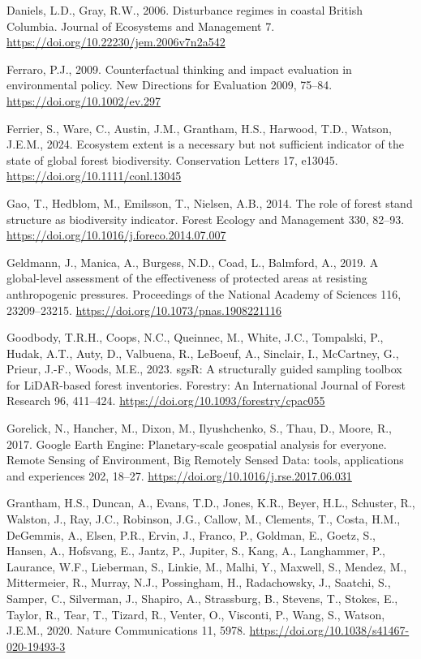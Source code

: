 \documentclass[
]{agujournal2019}
\newlength{\cslhangindent}
\newenvironment{CSLReferences}[2] %
 {\begin{list}{}{%
  \setlength{\itemindent}{0pt}
  \setlength{\leftmargin}{0pt}
  \setlength{\parsep}{0pt}
  \ifodd #1
   \setlength{\leftmargin}{\cslhangindent}
   \setlength{\itemindent}{-1\cslhangindent}
  \fi
  \setlength{\itemsep}{#2\baselineskip}}}
 {\end{list}}
\begin{document}
\begin{CSLReferences}{1}{0}
Daniels, L.D., Gray, R.W., 2006. Disturbance regimes in coastal British
Columbia. Journal of Ecosystems and Management 7.
\url{https://doi.org/10.22230/jem.2006v7n2a542}

Ferraro, P.J., 2009. Counterfactual thinking and impact evaluation in
environmental policy. New Directions for Evaluation 2009, 75--84.
\url{https://doi.org/10.1002/ev.297}

Ferrier, S., Ware, C., Austin, J.M., Grantham, H.S., Harwood, T.D.,
Watson, J.E.M., 2024. Ecosystem extent is a necessary but not sufficient
indicator of the state of global forest biodiversity. Conservation
Letters 17, e13045. \url{https://doi.org/10.1111/conl.13045}

Gao, T., Hedblom, M., Emilsson, T., Nielsen, A.B., 2014. The role of
forest stand structure as biodiversity indicator. Forest Ecology and
Management 330, 82--93.
\url{https://doi.org/10.1016/j.foreco.2014.07.007}

Geldmann, J., Manica, A., Burgess, N.D., Coad, L., Balmford, A., 2019. A
global-level assessment of the effectiveness of protected areas at
resisting anthropogenic pressures. Proceedings of the National Academy
of Sciences 116, 23209--23215.
\url{https://doi.org/10.1073/pnas.1908221116}

Goodbody, T.R.H., Coops, N.C., Queinnec, M., White, J.C., Tompalski, P.,
Hudak, A.T., Auty, D., Valbuena, R., LeBoeuf, A., Sinclair, I.,
McCartney, G., Prieur, J.-F., Woods, M.E., 2023. sgsR: A structurally
guided sampling toolbox for LiDAR-based forest inventories. Forestry: An
International Journal of Forest Research 96, 411--424.
\url{https://doi.org/10.1093/forestry/cpac055}

Gorelick, N., Hancher, M., Dixon, M., Ilyushchenko, S., Thau, D., Moore,
R., 2017. Google Earth Engine: Planetary-scale geospatial analysis for
everyone. Remote Sensing of Environment, Big Remotely Sensed Data:
tools, applications and experiences 202, 18--27.
\url{https://doi.org/10.1016/j.rse.2017.06.031}

Grantham, H.S., Duncan, A., Evans, T.D., Jones, K.R., Beyer, H.L.,
Schuster, R., Walston, J., Ray, J.C., Robinson, J.G., Callow, M.,
Clements, T., Costa, H.M., DeGemmis, A., Elsen, P.R., Ervin, J., Franco,
P., Goldman, E., Goetz, S., Hansen, A., Hofsvang, E., Jantz, P.,
Jupiter, S., Kang, A., Langhammer, P., Laurance, W.F., Lieberman, S.,
Linkie, M., Malhi, Y., Maxwell, S., Mendez, M., Mittermeier, R., Murray,
N.J., Possingham, H., Radachowsky, J., Saatchi, S., Samper, C.,
Silverman, J., Shapiro, A., Strassburg, B., Stevens, T., Stokes, E.,
Taylor, R., Tear, T., Tizard, R., Venter, O., Visconti, P., Wang, S.,
Watson, J.E.M., 2020. Nature Communications 11, 5978.
\url{https://doi.org/10.1038/s41467-020-19493-3}


\end{CSLReferences}
\end{document}

